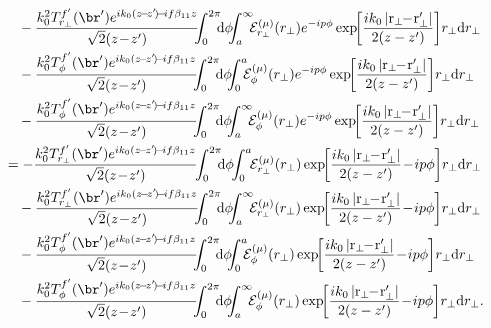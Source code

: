 \begin{align}
&\quad - \frac{k_0^2 T^{f'}_{r_\perp}(\br') e^{ik_0(z\!-\!z'\!)\!-\!if\beta_{11} z}}{\sqrt{2}(z\!-\!z')}  \!\!\! \int_0^{2\pi}\!\!\! \mathrm{d}\phi \!\!\! \int_a^\infty \!\!\! {\mathcal{E}^{(\mu)}_{r_\perp}} (r_\perp) e^{-i p\phi} \exp\!\! \left[ \frac{ik_0 \left| \mathrm{r}_\perp\!\! -\! \mathrm{r}_\perp'\right|}{2(z-z')}  \right]\!  r_\perp \mathrm{d}r_\perp \nonumber\\
&\quad - \frac{k_0^2 T^{f'}_\phi(\br') e^{ik_0(z\!-\!z'\!)\!-\!if\beta_{11} z}}{\sqrt{2}(z\!-\!z')} \!\!\! \int_0^{2\pi}\!\!\! \mathrm{d}\phi \!\!\! \int_0^a \!\!\! {\mathcal{E}^{(\mu)}_\phi} (r_\perp) e^{-i p\phi} \exp\!\! \left[ \frac{ik_0 \left| \mathrm{r}_\perp\!\! -\! \mathrm{r}_\perp'\right|}{2(z-z')}  \right]\!  r_\perp \mathrm{d}r_\perp \nonumber\\
&\quad - \frac{k_0^2 T^{f'}_\phi(\br') e^{ik_0(z\!-\!z'\!)\!-\!if\beta_{11} z}}{\sqrt{2}(z\!-\!z')}  \!\!\! \int_0^{2\pi}\!\!\!\mathrm{d}\phi\!\!\!  \int_a^\infty \!\!\! {\mathcal{E}^{(\mu)}_\phi} (r_\perp) e^{-i p\phi} \exp\!\! \left[ \frac{ik_0 \left| \mathrm{r}_\perp\!\! -\! \mathrm{r}_\perp'\right|}{2(z-z')}  \right]\!  r_\perp \mathrm{d}r_\perp \\
&=  - \frac{k_0^2 T^{f'}_{r_\perp}(\br') e^{ik_0(z\!-\!z'\!)\!-\!if\beta_{11} z}}{\sqrt{2}(z\!-\!z')} \!\! \int_0^{2\pi}\!\!\! \mathrm{d}\phi \!\! \int_0^a  \!\! \mathcal{E}^{(\mu)}_{r_\perp}(r_\perp)  
\exp\!\! \left[ \frac{ik_0 \left| \mathrm{r}_\perp\!\! -\! \mathrm{r}_\perp'\right|}{2(z-z')} \!-\! i p\phi  \right]\!  r_\perp \mathrm{d}r_\perp \nonumber\\
&\quad - \frac{k_0^2 T^{f'}_{r_\perp}(\br') e^{ik_0(z\!-\!z'\!)\!-\!if\beta_{11} z}}{\sqrt{2}(z\!-\!z')}  \!\!\! \int_0^{2\pi}\!\!\!\mathrm{d}\phi \!\!\! \int_a^\infty \!\!\! {\mathcal{E}^{(\mu)}_{r_\perp}} (r_\perp)  \exp\!\! \left[ \frac{ik_0 \left| \mathrm{r}_\perp\!\! -\! \mathrm{r}_\perp'\right|}{2(z-z')} \!-\! i p\phi \right]\!  r_\perp \mathrm{d}r_\perp \nonumber\\
&\quad - \frac{k_0^2 T^{f'}_\phi(\br') e^{ik_0(z\!-\!z'\!)\!-\!if\beta_{11} z}}{\sqrt{2}(z\!-\!z')} \!\!\! \int_0^{2\pi} \!\!\! \mathrm{d}\phi \!\!\! \int_0^a\!\!\! {\mathcal{E}^{(\mu)}_\phi} (r_\perp) \exp\!\! \left[ \frac{ik_0 \left| \mathrm{r}_\perp\!\! -\! \mathrm{r}_\perp'\right|}{2(z-z')} \!-\! i p\phi \right]\!  r_\perp \mathrm{d}r_\perp \nonumber\\
&\quad - \frac{k_0^2 T^{f'}_\phi(\br') e^{ik_0(z\!-\!z'\!)\!-\!if\beta_{11} z}}{\sqrt{2}(z\!-\!z')}  \!\!\! \int_0^{2\pi}\!\!\! \mathrm{d}\phi \!\!\! \int_a^\infty \!\!\! {\mathcal{E}^{(\mu)}_\phi} (r_\perp) \exp\!\! \left[ \frac{ik_0 \left| \mathrm{r}_\perp\!\! -\! \mathrm{r}_\perp'\right|}{2(z-z')} \!-\! i p\phi \right]\!  r_\perp \mathrm{d}r_\perp. \label{Cmu1}
\end{align}
